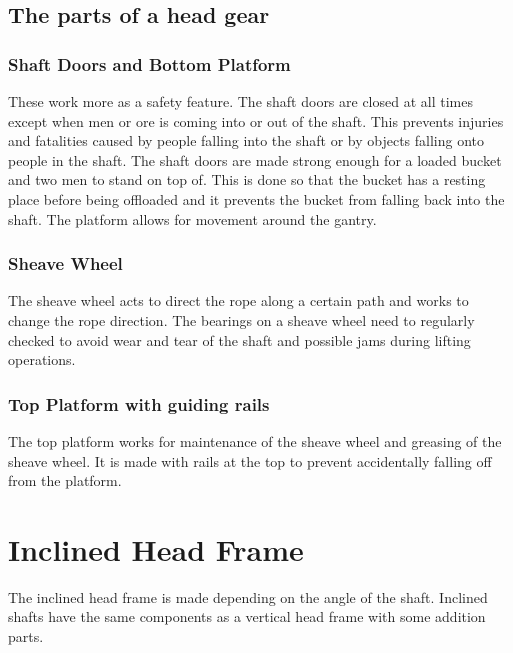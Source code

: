 \subsection{The parts of a head gear}


\subsubsection{ Shaft Doors and Bottom Platform}

\noindent These work more as a safety feature. The shaft doors are closed at all times except when men or ore is coming into or out of the shaft. This prevents injuries and fatalities caused by people falling into the shaft or by objects falling onto people in the shaft. The shaft doors are made strong enough for a loaded bucket and two men to stand on top of. This is done so that the bucket has a resting place before being offloaded and it prevents the bucket from falling back into the shaft. The platform allows for movement around the gantry. \par

\subsubsection{ Sheave Wheel}

\noindent The sheave wheel acts to direct the rope along a certain path and works to change the rope direction. The bearings on a sheave wheel need to regularly checked to avoid wear and tear of the shaft and possible jams during lifting operations. \par


\subsubsection{ Top Platform with guiding rails}

\noindent The top platform works for maintenance of the sheave wheel and greasing of the sheave wheel. It is made with rails at the top to prevent accidentally falling off from the platform. \par


\section{ Inclined Head Frame}

\noindent The inclined head frame is made depending on the angle of the shaft. Inclined shafts have the same components as a vertical head frame with some addition parts.


